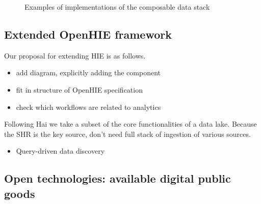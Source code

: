 \documentclass[
  authoryear]{elsarticle}
\providecommand{\tightlist}{%
  \setlength{\itemsep}{0pt}\setlength{\parskip}{0pt}}\usepackage{longtable,booktabs,array}
\begin{document}
\begin{figure}


\caption{\label{fig-cds-examples}Examples of implementations of the
composable data stack}

\end{figure}%

\subsection{Extended OpenHIE
framework}\label{extended-openhie-framework}

Our proposal for extending HIE is as follows.

\begin{itemize}
\tightlist
\item
  add diagram, explicitly adding the component
\item
  fit in structure of OpenHIE specification
\item
  check which workflows are related to analytics
\end{itemize}

Following Hai we take a subset of the core functionalities of a data
lake. Because the SHR is the key source, don't need full stack of
ingestion of various sources.

\begin{itemize}
\tightlist
\item
  Query-driven data discovery
\end{itemize}

\subsection{Open technologies: available digital public
goods}\label{open-technologies-available-digital-public-goods}
\end{document}
